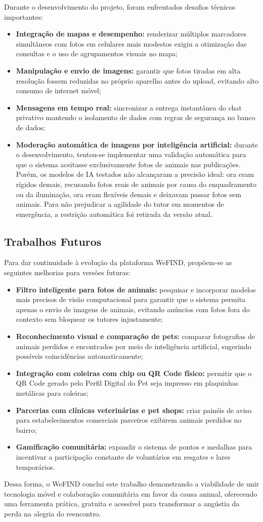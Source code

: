 Durante o desenvolvimento do projeto, foram enfrentados desafios técnicos importantes:
\begin{itemize}
    \item \textbf{Integração de mapas e desempenho:} renderizar múltiplos marcadores simultâneos com fotos em celulares mais modestos exigiu a otimização das consultas e o uso de agrupamentos visuais no mapa;
    \item \textbf{Manipulação e envio de imagens:} garantir que fotos tiradas em alta resolução fossem reduzidas no próprio aparelho antes do upload, evitando alto consumo de internet móvel;
    \item \textbf{Mensagens em tempo real:} sincronizar a entrega instantânea do chat privativo mantendo o isolamento de dados com regras de segurança no banco de dados;
    \item \textbf{Moderação automática de imagens por inteligência artificial:} durante o desenvolvimento, tentou-se implementar uma validação automática para que o sistema aceitasse exclusivamente fotos de animais nas publicações. Porém, os modelos de IA testados não alcançaram a precisão ideal: ora eram rígidos demais, recusando fotos reais de animais por causa do enquadramento ou da iluminação, ora eram flexíveis demais e deixavam passar fotos sem animais. Para não prejudicar a agilidade do tutor em momentos de emergência, a restrição automática foi retirada da versão atual.
\end{itemize}

\subsection{Trabalhos Futuros}

Para dar continuidade à evolução da plataforma WeFIND, propõem-se as seguintes melhorias para versões futuras:
\begin{itemize}
    \item \textbf{Filtro inteligente para fotos de animais:} pesquisar e incorporar modelos mais precisos de visão computacional para garantir que o sistema permita apenas o envio de imagens de animais, evitando anúncios com fotos fora do contexto sem bloquear os tutores injustamente;
    \item \textbf{Reconhecimento visual e comparação de pets:} comparar fotografias de animais perdidos e encontrados por meio de inteligência artificial, sugerindo possíveis coincidências automaticamente;
    \item \textbf{Integração com coleiras com chip ou QR Code físico:} permitir que o QR Code gerado pelo Perfil Digital do Pet seja impresso em plaquinhas metálicas para coleiras;
    \item \textbf{Parcerias com clínicas veterinárias e pet shops:} criar painéis de aviso para estabelecimentos comerciais parceiros exibirem animais perdidos no bairro;
    \item \textbf{Gamificação comunitária:} expandir o sistema de pontos e medalhas para incentivar a participação constante de voluntários em resgates e lares temporários.
\end{itemize}

Dessa forma, o WeFIND conclui este trabalho demonstrando a viabilidade de unir tecnologia móvel e colaboração comunitária em favor da causa animal, oferecendo uma ferramenta prática, gratuita e acessível para transformar a angústia da perda na alegria do reencontro.
\clearpage
